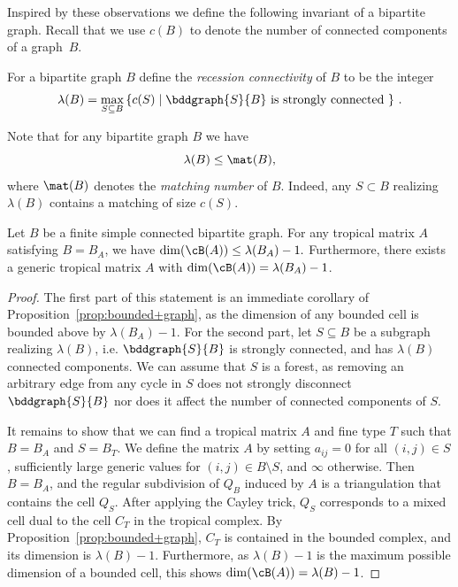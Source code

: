 Inspired by these observations we define the following invariant of a bipartite graph.  Recall that we use $c(B)$ to denote the number of connected components of a graph~$B$.

\begin{definition}\label{def: recession}
For a bipartite graph $B$ define the \emph{recession connectivity} of $B$ to be the integer
\[
\lambda(B) = \max_{S \subseteq B}\left\{c(S) \mid \bddgraph{S}{B} \text{ is strongly connected } \right\} \, .
\]
\end{definition} 


\begin{remark}\label{rem: lambdamatching}
Note that for any bipartite graph $B$ we have 
\[\lambda(B) \leq \mat(B),\]
\noindent
where $\mat(B)$ denotes the \emph{matching number} of $B$. Indeed, any $S \subset B$ realizing $\lambda(B)$ contains a matching of size $c(S)$.
\end{remark}


\begin{prop} \label{prop: bounded+complex+dimension}
Let $B$ be a finite simple connected bipartite graph.
For any tropical matrix $A$ satisfying $B = B_A$, we have $\dim(\cB(A)) \leq \lambda(B_A) - 1.$
Furthermore, there exists a generic tropical matrix $A$ with $\dim(\cB(A)) = \lambda(B_A) - 1$.
\end{prop}

\begin{proof}
The first part of this statement is an immediate corollary of Proposition~\ref{prop:bounded+graph}, as the dimension of any bounded cell is bounded above by $\lambda(B_A) - 1$.
For the second part, let $S \subseteq B$ be a subgraph realizing $\lambda(B)$, i.e. $\bddgraph{S}{B}$ is strongly connected, and has $\lambda(B)$ connected components.
We can assume that $S$ is a forest, as removing an arbitrary edge from any cycle in $S$ does not strongly disconnect $\bddgraph{S}{B}$ nor does it affect the number of connected components of $S$.

It remains to show that we can find a tropical matrix $A$ and fine type $T$ such that $B = B_A$ and $S = B_T$.
We define the matrix $A$ by setting $a_{ij} = 0$ for all $(i,j) \in S$, sufficiently large generic values for $(i,j) \in B \setminus S$, and $\infty$ otherwise.
Then $B = B_A$, and the regular subdivision of $Q_B$ induced by $A$ is a triangulation that contains the cell $Q_{S}$.
After applying the Cayley trick, $Q_{S}$ corresponds to a mixed cell dual to the cell $C_T$ in the tropical complex.
By Proposition~\ref{prop:bounded+graph}, $C_T$ is contained in the bounded complex, and its dimension is $\lambda(B) - 1$.
Furthermore, as $\lambda(B) - 1$ is the maximum possible dimension of a bounded cell, this shows $\dim(\cB(A)) = \lambda(B) -1$.
\end{proof}

